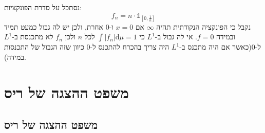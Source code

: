 \documentclass{tstextbook}
\begin{document}
\begin{example}
נסתכל על סדרת הפונקציות:
$$f_{n}=n\cdot \mathbb{1} _{\left[ 0,\frac{1}{n} \right]}$$
נקבל כי הפונקציה הנקודתית תהיה \(\infty\) אם \(x=0\) ו-0 אחרת, ולכן יש לה גבול כמעט תמיד ובמידה \(f=0\). אי לה גבול ב-\(L^{1}\) כי \(\int\lvert f_{n} \rvert \mathrm{d}\mu =1\) לכל \(n\) ולכן \(f_{n}\) לא מתכנסת ב-\(L^{1}\) ל-0(כאשר אם היה מתכנס ב-\(L^{1}\) היה צריך בהכרח להתכנס ל-0 כיוון שזה הגבול של התכנסות במידה). 

\end{example}
\chapter{משפט ההצגה של ריס}

\section{משפט ההצגה של ריס}
\end{document}
